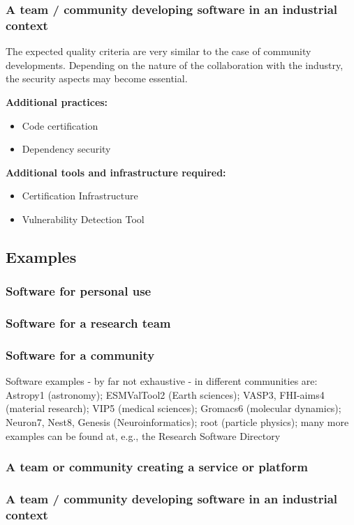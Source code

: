 \subsubsection{A team / community developing software in an industrial context}

The expected quality criteria are very similar to the case of
community developments. Depending on the nature of the collaboration
with the industry, the security aspects may become essential. 

{\bf Additional practices:}
\begin{itemize}
\item Code certification
\item Dependency security
\end{itemize}

{\bf Additional tools and infrastructure required:}
\begin{itemize}
\item Certification Infrastructure
\item Vulnerability Detection Tool
\end{itemize}

\subsection{Examples}


\subsubsection{Software for personal use}


\subsubsection{Software for a research team}

\subsubsection{Software for a community}

Software examples - by far not exhaustive - in different communities
are: Astropy1 (astronomy);  ESMValTool2 (Earth sciences); VASP3,
FHI-aims4 (material research); VIP5 (medical sciences); Gromacs6
(molecular dynamics); Neuron7, Nest8, Genesis (Neuroinformatics); root
(particle physics); many more examples can be found at, e.g., the
Research Software Directory


\subsubsection{A team or community creating a service or platform}

\subsubsection{A team / community developing software in an industrial context}
